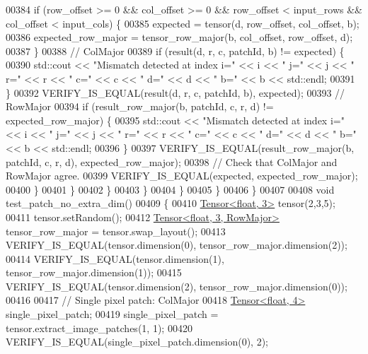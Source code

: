 \begin{DoxyCode}
00384               \textcolor{keywordflow}{if} (row\_offset >= 0 && col\_offset >= 0 && row\_offset < input\_rows && col\_offset < input\_cols)
       \{
00385                 expected = tensor(d, row\_offset, col\_offset, b);
00386                 expected\_row\_major = tensor\_row\_major(b, col\_offset, row\_offset, d);
00387               \}
00388               \textcolor{comment}{// ColMajor}
00389               \textcolor{keywordflow}{if} (result(d, r, c, patchId, b) != expected) \{
00390                 std::cout << \textcolor{stringliteral}{"Mismatch detected at index i="} << i << \textcolor{stringliteral}{" j="} << j << \textcolor{stringliteral}{" r="} << r << \textcolor{stringliteral}{" c="} << c
       << \textcolor{stringliteral}{" d="} << d << \textcolor{stringliteral}{" b="} << b << std::endl;
00391               \}
00392               VERIFY\_IS\_EQUAL(result(d, r, c, patchId, b), expected);
00393               \textcolor{comment}{// RowMajor}
00394               \textcolor{keywordflow}{if} (result\_row\_major(b, patchId, c, r, d) != expected\_row\_major) \{
00395                 std::cout << \textcolor{stringliteral}{"Mismatch detected at index i="} << i << \textcolor{stringliteral}{" j="} << j << \textcolor{stringliteral}{" r="} << r << \textcolor{stringliteral}{" c="} << c
       << \textcolor{stringliteral}{" d="} << d << \textcolor{stringliteral}{" b="} << b << std::endl;
00396               \}
00397               VERIFY\_IS\_EQUAL(result\_row\_major(b, patchId, c, r, d), expected\_row\_major);
00398               \textcolor{comment}{// Check that ColMajor and RowMajor agree.}
00399               VERIFY\_IS\_EQUAL(expected, expected\_row\_major);
00400             \}
00401           \}
00402         \}
00403       \}
00404     \}
00405   \}
00406 \}
00407 
00408 \textcolor{keywordtype}{void} test\_patch\_no\_extra\_dim()
00409 \{
00410   \hyperlink{class_eigen_1_1_tensor}{Tensor<float, 3>} tensor(2,3,5);
00411   tensor.setRandom();
00412   \hyperlink{class_eigen_1_1_tensor}{Tensor<float, 3, RowMajor>} tensor\_row\_major = tensor.swap\_layout();
00413   VERIFY\_IS\_EQUAL(tensor.dimension(0), tensor\_row\_major.dimension(2));
00414   VERIFY\_IS\_EQUAL(tensor.dimension(1), tensor\_row\_major.dimension(1));
00415   VERIFY\_IS\_EQUAL(tensor.dimension(2), tensor\_row\_major.dimension(0));
00416 
00417   \textcolor{comment}{// Single pixel patch: ColMajor}
00418   \hyperlink{class_eigen_1_1_tensor}{Tensor<float, 4>} single\_pixel\_patch;
00419   single\_pixel\_patch = tensor.extract\_image\_patches(1, 1);
00420   VERIFY\_IS\_EQUAL(single\_pixel\_patch.dimension(0), 2);

\end{DoxyCode}

